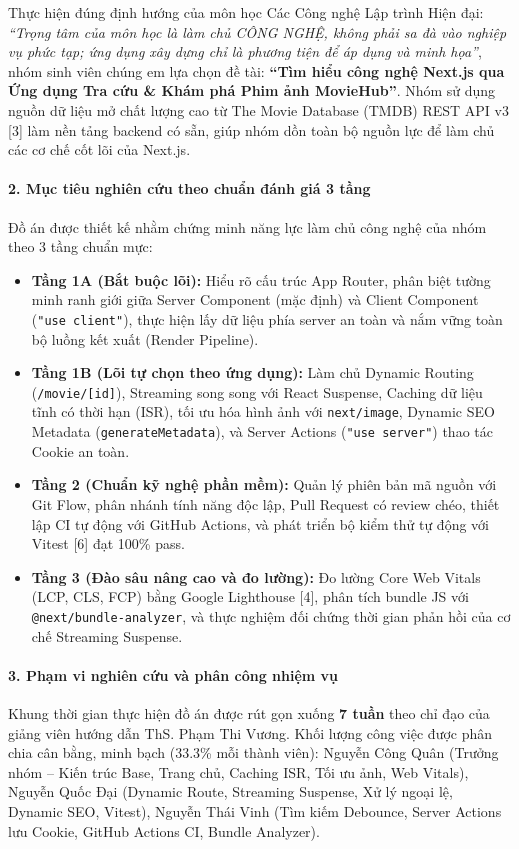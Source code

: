 \documentclass[13pt,a4paper]{extarticle}
\begin{document}
Thực hiện đúng định hướng của môn học Các Công nghệ Lập trình Hiện đại: \textit{``Trọng tâm của môn học là làm chủ CÔNG NGHỆ, không phải sa đà vào nghiệp vụ phức tạp; ứng dụng xây dựng chỉ là phương tiện để áp dụng và minh họa''}, nhóm sinh viên chúng em lựa chọn đề tài: \textbf{``Tìm hiểu công nghệ Next.js qua Ứng dụng Tra cứu \& Khám phá Phim ảnh MovieHub''}. Nhóm sử dụng nguồn dữ liệu mở chất lượng cao từ The Movie Database (TMDB) REST API v3 [3] làm nền tảng backend có sẵn, giúp nhóm dồn toàn bộ nguồn lực để làm chủ các cơ chế cốt lõi của Next.js.

\paragraph*{2. Mục tiêu nghiên cứu theo chuẩn đánh giá 3 tầng}
Đồ án được thiết kế nhằm chứng minh năng lực làm chủ công nghệ của nhóm theo 3 tầng chuẩn mực:
\begin{itemize}[noitemsep]
    \item \textbf{Tầng 1A (Bắt buộc lõi):} Hiểu rõ cấu trúc App Router, phân biệt tường minh ranh giới giữa Server Component (mặc định) và Client Component (\texttt{"use client"}), thực hiện lấy dữ liệu phía server an toàn và nắm vững toàn bộ luồng kết xuất (Render Pipeline).
    \item \textbf{Tầng 1B (Lõi tự chọn theo ứng dụng):} Làm chủ Dynamic Routing (\texttt{/movie/[id]}), Streaming song song với React Suspense, Caching dữ liệu tĩnh có thời hạn (ISR), tối ưu hóa hình ảnh với \texttt{next/image}, Dynamic SEO Metadata (\texttt{generateMetadata}), và Server Actions (\texttt{"use server"}) thao tác Cookie an toàn.
    \item \textbf{Tầng 2 (Chuẩn kỹ nghệ phần mềm):} Quản lý phiên bản mã nguồn với Git Flow, phân nhánh tính năng độc lập, Pull Request có review chéo, thiết lập CI tự động với GitHub Actions, và phát triển bộ kiểm thử tự động với Vitest [6] đạt 100\% pass.
    \item \textbf{Tầng 3 (Đào sâu nâng cao và đo lường):} Đo lường Core Web Vitals (LCP, CLS, FCP) bằng Google Lighthouse [4], phân tích bundle JS với \texttt{@next/bundle-analyzer}, và thực nghiệm đối chứng thời gian phản hồi của cơ chế Streaming Suspense.
\end{itemize}

\paragraph*{3. Phạm vi nghiên cứu và phân công nhiệm vụ}
Khung thời gian thực hiện đồ án được rút gọn xuống \textbf{7 tuần} theo chỉ đạo của giảng viên hướng dẫn ThS. Phạm Thi Vương. Khối lượng công việc được phân chia cân bằng, minh bạch (33.3\% mỗi thành viên): Nguyễn Công Quân (Trưởng nhóm -- Kiến trúc Base, Trang chủ, Caching ISR, Tối ưu ảnh, Web Vitals), Nguyễn Quốc Đại (Dynamic Route, Streaming Suspense, Xử lý ngoại lệ, Dynamic SEO, Vitest), Nguyễn Thái Vinh (Tìm kiếm Debounce, Server Actions lưu Cookie, GitHub Actions CI, Bundle Analyzer).
\end{document}
